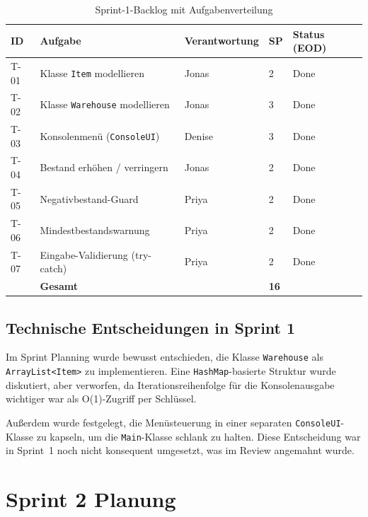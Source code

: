 \documentclass[12pt, a4paper, twoside]{report}
\newcommand{\cmark}{\textcolor{darkGreen}{\ding{51}}}
\begin{document}
\begin{table}[H]
  \centering
  \caption{Sprint-1-Backlog mit Aufgabenverteilung}
  \label{tab:sprint1}
  \begin{tabularx}{\textwidth}{C{0.7cm} L{4.5cm} L{3.5cm} C{1.5cm} C{2.5cm}}
    \toprule
    \textbf{ID} & \textbf{Aufgabe} & \textbf{Verantwortung} & \textbf{SP} & \textbf{Status (EOD)} \\
    \midrule
    T-01 & Klasse \texttt{Item} modellieren    & Jonas        & 2 & \cmark{} Done \\
    T-02 & Klasse \texttt{Warehouse} modellieren & Jonas      & 3 & \cmark{} Done \\
    T-03 & Konsolenmenü (\texttt{ConsoleUI})   & Denise       & 3 & \cmark{} Done \\
    T-04 & Bestand erhöhen / verringern        & Jonas        & 2 & \cmark{} Done \\
    T-05 & Negativbestand-Guard                & Priya        & 2 & \cmark{} Done \\
    T-06 & Mindestbestandswarnung              & Priya        & 2 & \cmark{} Done \\
    T-07 & Eingabe-Validierung (try-catch)     & Priya        & 2 & \cmark{} Done \\
    \midrule
    & \textbf{Gesamt}                          &              & \textbf{16} & \\
    \bottomrule
  \end{tabularx}
\end{table}

\subsection{Technische Entscheidungen in Sprint 1}

Im Sprint Planning wurde bewusst entschieden, die Klasse \texttt{Warehouse} als
\texttt{ArrayList<Item>} zu implementieren. Eine \texttt{HashMap}-basierte Struktur
wurde diskutiert, aber verworfen, da Iterationsreihenfolge für die Konsolenausgabe
wichtiger war als O(1)-Zugriff per Schlüssel.

Außerdem wurde festgelegt, die Menüsteuerung in einer separaten \texttt{ConsoleUI}-Klasse
zu kapseln, um die \texttt{Main}-Klasse schlank zu halten. Diese Entscheidung war in
Sprint~1 noch nicht konsequent umgesetzt, was im Review angemahnt wurde.

\section{Sprint 2 \textendash{} Planung}
\end{document}
